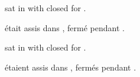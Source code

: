 \documentclass{article}
\begin{document}

 sat in  with  closed for
.

 était assis dans ,  fermé
pendant .

 sat in  with  closed
for .

 étaient assis dans , 
fermés pendant .

\printunsrtglossaries
\end{document}
